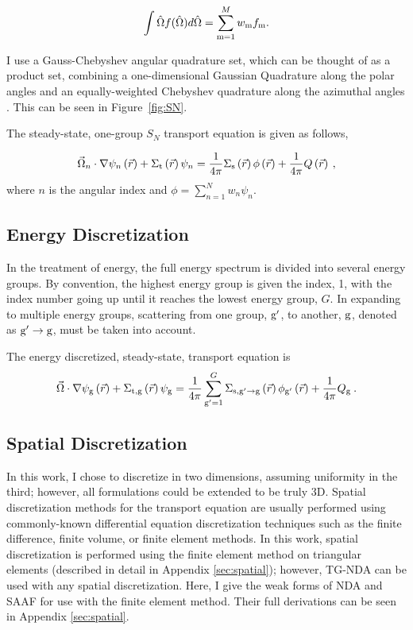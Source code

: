\begin{equation}
\int \hat{\Omega} f(\hat{\Omega}) d \hat{\Omega} = \sum\limits_{\mathrm{m}=1}^{M} w_{\mathrm{m}} f_{\mathrm{m}}.    
\end{equation}

I use a Gauss-Chebyshev angular quadrature set, which can be thought of as a product set, combining a one-dimensional Gaussian Quadrature along the polar angles and an equally-weighted Chebyshev quadrature along the azimuthal angles \cite{jarrel-thesis}. This can be seen in Figure~\ref{fig:SN}. 

The steady-state, one-group $S_N$ transport equation is given as follows,

 \begin{equation}
  \vec{\Omega}_n \cdot \nabla \psi_n \left(\vec{r}\right)+ \Sigma_{\mathrm{t}}\left(\vec{r}\right)\psi_n = \frac{1}{4 \pi} \Sigma_{\mathrm{s}}\left(\vec{r}\right) \phi\left(\vec{r}\right) + \frac{1}{4 \pi} Q\left(\vec{r}\right)\:,
  \label{eq:transport-angular}
 \end{equation}
where $n$ is the angular index and $\phi = \sum\limits_{n=1}^N w_n \psi_n$.


\subsection{Energy Discretization}
In the treatment of energy, the full energy spectrum is divided into several energy groups. By convention, the highest energy group is given the index, 1, with the index number going up until it reaches the lowest energy group, $G$. In expanding to multiple energy groups, scattering from one group, $\mathrm{g}'$, to another, $\mathrm{g}$, denoted as $\mathrm{g}' \rightarrow \mathrm{g} $, must be taken into account. 

The energy discretized, steady-state, transport equation is
%
 \begin{equation}
  \vec{\Omega} \cdot \nabla \psi_{\mathrm{g}} \left(\vec{r}\right)+ \Sigma_{\mathrm{t}, \mathrm{g}}\left(\vec{r}\right)\psi_{\mathrm{g}} = \frac{1}{4 \pi} \sum\limits_{\mathrm{g}'=1}^{G}\Sigma_{\mathrm{s}, \mathrm{g}' \rightarrow \mathrm{g}}\left(\vec{r}\right) \phi_{\mathrm{g}'}\left(\vec{r}\right) + \frac{1}{4 \pi} Q_{\mathrm{g}}\:.
  \label{eq:transport-energy}
 \end{equation}


\subsection{Spatial Discretization}
In this work, I chose to discretize in two dimensions, assuming uniformity in the third; however, all formulations could be extended to be truly 3D. Spatial discretization methods for the transport equation are usually performed using commonly-known differential equation discretization techniques such as the finite difference, finite volume, or finite element methods. In this work, spatial discretization is performed using the finite element method on triangular elements (described in detail in Appendix \ref{sec:spatial}); however, TG-NDA can be used with any spatial discretization. Here, I give the weak forms of NDA and SAAF for use with the finite element method. Their full derivations can be seen in Appendix \ref{sec:spatial}. 


